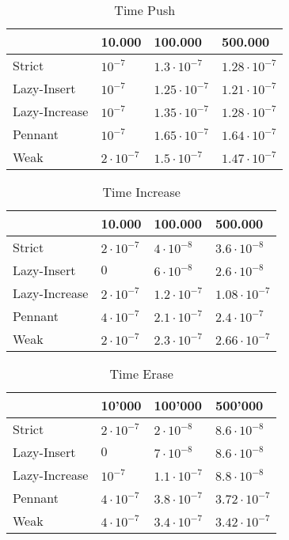 \documentclass{DIKU-article}[2010/01/13]
\begin{document}
\begin{table}[h!]
\centering
\caption{Time Push}
\begin{tabular}{l|lll}
\label{tab:time.first}
  & 10.000 & 100.000 & 500.000 \\
  \hline
  Strict & $10^{-7}$ & $1.3\cdot 10^{-7}$ & $1.28\cdot 10^{-7}$\\
  Lazy-Insert & $10^{-7}$ & $1.25\cdot 10^{-7}$ & $1.21\cdot 10^{-7}$\\
  Lazy-Increase & $10^{-7}$ & $1.35\cdot 10^{-7}$ & $1.28\cdot 10^{-7}$\\
  Pennant & $10^{-7}$ & $1.65\cdot 10^{-7}$ & $1.64\cdot 10^{-7}$\\
  Weak & $2\cdot 10^{-7}$ & $1.5\cdot 10^{-7}$ & $1.47\cdot 10^{-7}$

\end{tabular}
\end{table}

\begin{table}[h!]
\centering
\caption{Time Increase}
\begin{tabular}{l|lll}
 & 10.000 & 100.000 & 500.000 \\
\hline
Strict & $2\cdot 10^{-7}$ & $4\cdot 10^{-8}$ & $3.6\cdot 10^{-8}$\\
Lazy-Insert & $0$ & $6\cdot 10^{-8}$ & $2.6\cdot 10^{-8}$\\
Lazy-Increase & $2\cdot 10^{-7}$ & $1.2\cdot 10^{-7}$ & $1.08\cdot 10^{-7}$\\
Pennant & $4\cdot 10^{-7}$ & $2.1\cdot 10^{-7}$ & $2.4\cdot 10^{-7}$\\
Weak & $2\cdot 10^{-7}$ & $2.3\cdot 10^{-7}$ & $2.66\cdot 10^{-7}$

\end{tabular}
\end{table}

\begin{table}[h!]
\centering
\caption{Time Erase}
\begin{tabular}{l|lll}
 & 10'000 & 100'000 & 500'000 \\
\hline
Strict & $2\cdot 10^{-7}$ & $2\cdot 10^{-8}$ & $8.6\cdot 10^{-8}$\\
Lazy-Insert & $0$ & $7\cdot 10^{-8}$ & $8.6\cdot 10^{-8}$\\
Lazy-Increase & $10^{-7}$ & $1.1\cdot 10^{-7}$ & $8.8\cdot 10^{-8}$\\
Pennant & $4\cdot 10^{-7}$ & $3.8\cdot 10^{-7}$ & $3.72\cdot 10^{-7}$\\
Weak & $4\cdot 10^{-7}$ & $3.4\cdot 10^{-7}$ & $3.42\cdot 10^{-7}$

\end{tabular}
\end{table}
\end{document}
